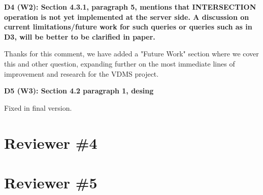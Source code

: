 \documentclass[11pt]{proposalnsf}
\begin{document}
\bigskip
\textbf{
D4 (W2): Section 4.3.1, paragraph 5, mentions that INTERSECTION operation is not
yet implemented at the server side.
A discussion on current limitations/future work for such queries or queries
such as in D3, will be better to be clarified in paper.
}\bigskip

Thanks for this comment, we have added a "Future Work" section where we cover
this and other question, expanding further on the most immediate lines of
improvement and research for the VDMS project.

\bigskip
\textbf{
D5 (W3): Section 4.2 paragraph 1, desing
}\bigskip

Fixed in final version.

\bigskip

\newpage
\section{Reviewer \#4}

\newpage
\section{Reviewer \#5}

\end{document}
